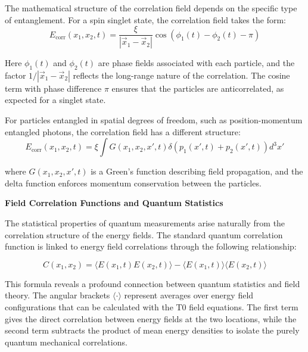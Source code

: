 \documentclass[12pt,a4paper]{article}
\newcommand{\xipar}{\xi}
\theoremstyle{definition}
\theoremstyle{remark}
\begin{document}
	The mathematical structure of the correlation field depends on the specific type of entanglement. For a spin singlet state, the correlation field takes the form:
	\begin{equation}
		E_{\text{corr}}(x_1,x_2,t) = \frac{\xipar}{|\vec{x}_1 - \vec{x}_2|} \cos(\phi_1(t) - \phi_2(t) - \pi)
		\label{eq:singlet_correlation}
	\end{equation}
	
	Here $\phi_1(t)$ and $\phi_2(t)$ are phase fields associated with each particle, and the factor $1/|\vec{x}_1 - \vec{x}_2|$ reflects the long-range nature of the correlation. The cosine term with phase difference $\pi$ ensures that the particles are anticorrelated, as expected for a singlet state.
	
	For particles entangled in spatial degrees of freedom, such as position-momentum entangled photons, the correlation field has a different structure:
	\begin{equation}
		E_{\text{corr}}(x_1,x_2,t) = \xipar \int G(x_1,x_2,x',t) \delta(p_1(x',t) + p_2(x',t)) d^3x'
		\label{eq:position_momentum_correlation}
	\end{equation}
	
	where $G(x_1,x_2,x',t)$ is a Green's function describing field propagation, and the delta function enforces momentum conservation between the particles.
	
	\textbf{Field Correlation Functions and Quantum Statistics}
	
	The statistical properties of quantum measurements arise naturally from the correlation structure of the energy fields. The standard quantum correlation function is linked to energy field correlations through the following relationship:
	
	\begin{equation}
		C(x_1,x_2) = \langle E(x_1,t) E(x_2,t) \rangle - \langle E(x_1,t) \rangle \langle E(x_2,t) \rangle
		\label{eq:field_correlation_function}
	\end{equation}
	
	This formula reveals a profound connection between quantum statistics and field theory. The angular brackets $\langle \cdot \rangle$ represent averages over energy field configurations that can be calculated with the T0 field equations. The first term gives the direct correlation between energy fields at the two locations, while the second term subtracts the product of mean energy densities to isolate the purely quantum mechanical correlations.
	
\end{document}
